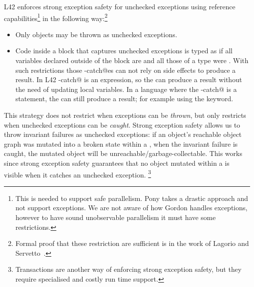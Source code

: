 L42 enforces strong exception safety for unchecked exceptions using reference capabilities\footnote{%
This is needed to support safe parallelism. Pony takes a drastic approach and not support exceptions. 
We are not aware of how Gordon \etal handles exceptions, however to have sound unobservable parallelism it must have some restrictions.%
}
in the following way:\footnote{%
Formal proof that these restriction are sufficient
is in the work of Lagorio and Servetto~\cite{JOT:issue_2011_01/article1}.
}
\begin{itemize}
\item Only \Q@imm@ objects may be thrown as unchecked exceptions.
\item Code inside a \Q@try@ block that captures unchecked exceptions is typed as 
if all variables declared outside of the block are \Q@final@ and all those of a \Q@mut@ type were \Q@read@.
With such restrictions those \Q@try-catch@es can not rely on side effects
to produce a result. In L42 \Q@try-catch@ is an expression, so the \Q@try@ can produce a result without the need of updating local variables.
In a language where the \Q@try-catch@ is a statement, the \Q@try@ can still produce a result; for example using the \Q@return@ keyword.

\end{itemize} 
This strategy does not restrict when exceptions can be \emph{thrown}, but only restricts when unchecked exceptions can be \emph{caught}.
Strong exception safety allows us to throw invariant failures as unchecked exceptions: if an object's reachable object graph was mutated into a broken state within a \Q@try@, when the invariant failure is caught, the mutated object will be unreachable/garbage-collectable. This works since strong exception safety guarantees that no object mutated within a \Q@try@ is visible when it catches an unchecked exception.%
\footnote{Transactions are another way of enforcing strong exception safety, but they require specialised and costly run time support.}

